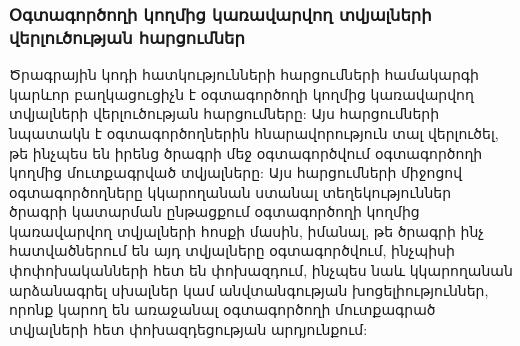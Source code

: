\subsubsection*{Օգտագործողի կողմից կառավարվող տվյալների վերլուծության հարցումներ}\label{subsubsec:taintAnalisys}
Ծրագրային կոդի հատկությունների հարցումների համակարգի կարևոր բաղկացուցիչն է օգտագործողի կողմից կառավարվող տվյալների վերլուծության հարցումները:
Այս հարցումների նպատակն է օգտագործողներին հնարավորություն տալ վերլուծել, թե ինչպես են իրենց ծրագրի մեջ օգտագործվում
օգտագործողի կողմից մուտքագրված տվյալները:
Այս հարցումների միջոցով օգտագործողները կկարողանան ստանալ տեղեկություններ ծրագրի կատարման ընթացքում օգտագործողի կողմից
կառավարվող տվյալների հոսքի մասին, իմանալ, թե ծրագրի ինչ հատվածներում են այդ տվյալները օգտագործվում, ինչպիսի փոփոխականների
հետ են փոխազդում, ինչպես նաև կկարողանան արձանագրել սխալներ կամ անվտանգության խոցելիություններ, որոնք կարող են առաջանալ օգտագործողի
մուտքագրած տվյալների հետ փոխազդեցության արդյունքում: